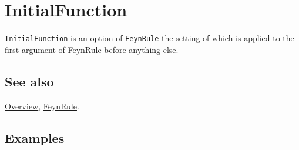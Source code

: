 \documentclass[../FeynCalcManual.tex]{subfiles}
\begin{document}
\hypertarget{initialfunction}{%
\section{InitialFunction}\label{initialfunction}}

\texttt{InitialFunction} is an option of \texttt{FeynRule} the setting
of which is applied to the first argument of FeynRule before anything
else.

\subsection{See also}

\hyperlink{toc}{Overview}, \hyperlink{feynrule}{FeynRule}.

\subsection{Examples}
\end{document}
